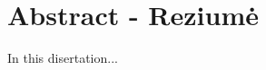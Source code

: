 \chapter*{Abstract - Reziumė }
\label{cha:abstract}


In this disertation...
\if{} \thesisTitleEN \else \thesisTitleLT \fi
